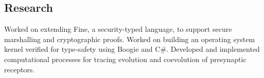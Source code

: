 \documentclass[10pt,a4paper]{moderncv}
\begin{document}
\subsection{Research}
  {Worked on extending Fine, a security-typed language, to support secure marshalling and cryptographic proofs.}
  {Worked on building an operating system kernel verified for type-safety using Boogie and C\#.}
  {Developed and implemented computational processes for tracing evolution and coevolution of presynaptic receptors.}
\end{document}
